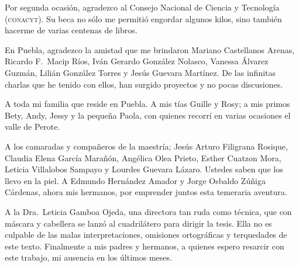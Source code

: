 \documentclass[14pt,twoside,final]{extbook} %
\begin{document}
Por segunda ocasión, agradezco al Consejo Nacional de Ciencia y Tecnología (\textsc{conacyt}). Su beca no sólo me permitió engordar algunos kilos, sino también hacerme de varias centenas de libros.

En Puebla, agradezco la amistad que me brindaron Mariano Castellanos Arenas, Ricardo F.~Macip Ríos, Iván Gerardo González Nolasco, Vanessa Álvarez Guzmán, Lilián González Torres y Jesús Guevara Martínez. De las infinitas charlas que he tenido con ellos, han surgido proyectos y no pocas discusiones.

A toda mi familia que reside en Puebla. A mis tías Guille y Rosy; a mis primos Bety, Andy, Jessy y la pequeña Paola, con quienes recorrí en varias ocasiones el valle de Perote.

A los camaradas y compañeros de la maestría; Jesús Arturo Filigrana Rosique, Claudia Elena García Marañón, Angélica Olea Prieto, Esther Cuatzon Mora, Leticia Villalobos Sampayo y Lourdes Guevara Lázaro. Ustedes saben que los llevo en la piel. A Edmundo Hernández Amador y Jorge Osbaldo Zúñiga Cárdenas, ahora mis hermanos, por emprender juntos esta temeraria aventura.

A la Dra.~Leticia Gamboa Ojeda, una directora tan ruda como técnica, que con máscara y cabellera se lanzó al cuadrilátero para dirigir la tesis. Ella no es culpable de las malas interpretaciones, omisiones ortográficas y terquedades de este texto. Finalmente a mis padres y hermanos, a quienes espero resarcir con este trabajo, mi ausencia en los últimos meses.
\cleardoublepage %
\makeatletter
\renewcommand\@dotsep{200} %
\makeatother
\renewcommand{\contentsname}{Contenidos}
\thispagestyle{empty}
\pagestyle{fancy}
\fancyhf{} %
\fancyhead[RO,LE]{\thepage}
\fancyfoot{}
\renewcommand{\headrulewidth}{0pt}
\setcounter{page}{11}
\tableofcontents
\makeatletter
\renewcommand\@dotsep{200} %
\makeatother
\renewcommand{\listtablename}{Cuadros}
\listoftables
\thispagestyle{empty}
\pagestyle{fancy}
\fancyhf{} %
\fancyhead[RO,LE]{\thepage}
\fancyfoot{}
\renewcommand{\headrulewidth}{0pt}
\setcounter{page}{13}
\makeatletter
\renewcommand\@dotsep{200} %
\makeatother
\renewcommand{\listfigurename}{Imágenes}
\listoffigures
\thispagestyle{empty}
\pagestyle{fancy}
\fancyhf{} %
\fancyhead[RO,LE]{\thepage}
\fancyfoot{}
\renewcommand{\headrulewidth}{0pt}
\setcounter{page}{15}
\end{document}
